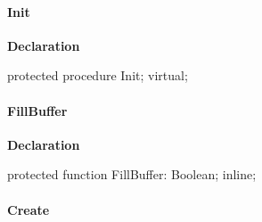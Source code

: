 \documentclass{report}
\newif\ifpdf
\begin{document}
\paragraph*{Init}\hspace*{\fill}

\label{PasDoc_StreamUtils.TBufferedStream-Init}
\begin{list}{}{
\setlength{\itemindent}{0cm}
\setlength{\listparindent}{0cm}
\setlength{\leftmargin}{\evensidemargin}
\addtolength{\leftmargin}{\tmplength}
\settowidth{\labelsep}{X}
\addtolength{\leftmargin}{\labelsep}
\setlength{\labelwidth}{\tmplength}
}
\item[\textbf{Declaration}\hfill]
\ifpdf
\begin{flushleft}
\fi
\begin{ttfamily}
protected procedure Init; virtual;\end{ttfamily}

\ifpdf
\end{flushleft}
\fi

\end{list}
\paragraph*{FillBuffer}\hspace*{\fill}

\label{PasDoc_StreamUtils.TBufferedStream-FillBuffer}
\begin{list}{}{
\setlength{\itemindent}{0cm}
\setlength{\listparindent}{0cm}
\setlength{\leftmargin}{\evensidemargin}
\addtolength{\leftmargin}{\tmplength}
\settowidth{\labelsep}{X}
\addtolength{\leftmargin}{\labelsep}
\setlength{\labelwidth}{\tmplength}
}
\item[\textbf{Declaration}\hfill]
\ifpdf
\begin{flushleft}
\fi
\begin{ttfamily}
protected function FillBuffer: Boolean; inline;\end{ttfamily}

\ifpdf
\end{flushleft}
\fi

\end{list}
\paragraph*{Create}\hspace*{\fill}
\end{document}
